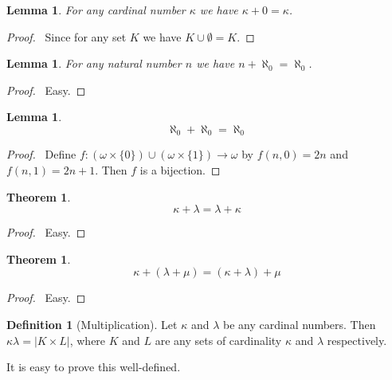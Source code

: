 \documentclass{article}
\let\qed\relax
\newtheorem{lemma}[axiom]{Lemma}
\newtheorem{theorem}[axiom]{Theorem}
\theoremstyle{definition}
\newtheorem{definition}[axiom]{Definition}
\begin{document}
    \begin{lemma}
        For any cardinal number $\kappa$ we have $\kappa + 0 = \kappa$.
    \end{lemma}

    \begin{proof}
        \pf\ Since for any set $K$ we have $K \cup \emptyset = K$.
    \end{proof}

    \begin{lemma}
        For any natural number $n$ we have $n + \aleph_0 = \aleph_0$.
    \end{lemma}

    \begin{proof}
        \pf\ Easy. \qed
    \end{proof}

    \begin{lemma}
        \label{lemma:aleph0_plus_aleph0}
        \[ \aleph_0 + \aleph_0 = \aleph_0 \]
    \end{lemma}

    \begin{proof}
        \pf\ Define $f : (\omega \times \{ 0 \}) \cup (\omega \times \{1\}) \rightarrow \omega$ by
        $f(n,0) = 2n$ and $f(n,1) = 2n+1$. Then $f$ is a bijection. \qed
    \end{proof}

    \begin{theorem}
        \[ \kappa + \lambda = \lambda + \kappa \]
    \end{theorem}

    \begin{proof}
        \pf\ Easy. \qed
    \end{proof}

    \begin{theorem}
        \[ \kappa + (\lambda + \mu) = (\kappa + \lambda) + \mu \]
    \end{theorem}

    \begin{proof}
        \pf\ Easy. \qed
    \end{proof}

    \begin{definition}[Multiplication]
        Let $\kappa$ and $\lambda$ be any cardinal numbers. Then $\kappa \lambda = |K \times L|$,
        where $K$ and $L$ are any sets of cardinality $\kappa$ and $\lambda$ respectively.
    \end{definition}

    It is easy to prove this well-defined.
\end{document}

